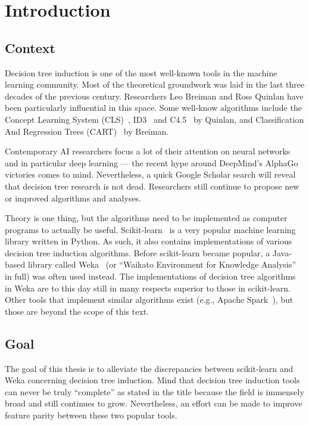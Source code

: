 \chapter{Introduction}\label{cha:intro}

\section{Context}
Decision tree induction is one of the most well-known tools in the machine learning community. Most of the theoretical groundwork was laid in the last three decades of the previous century. Researchers Leo Breiman and Ross Quinlan have been particularly influential in this space. Some well-know algorithms include the Concept Learning System (CLS)~\cite{cls}, ID3~\cite{id3, id3bis, id3ter} and C4.5~\cite{c45} by Quinlan, and Classification And Regression Trees (CART)~\cite{cart} by Breiman. 

Contemporary AI researchers focus a lot of their attention on neural networks and in particular deep learning --- the recent hype around DeepMind's AlphaGo~\cite{alphago} victories comes to mind. Nevertheless, a quick Google Scholar search will reveal that decision tree research is not dead. Researchers still continue to propose new or improved algorithms and analyses.

Theory is one thing, but the algorithms need to be implemented as computer programs to actually be useful. Scikit-learn~\cite{scikit-learn} is a very popular machine learning library written in Python. As such, it also contains implementations of various decision tree induction algorithms. Before scikit-learn became popular, a Java-based library called Weka~\cite{eibe2016weka} (or ``Waikato Environment for Knowledge Analysis'' in full) was often used instead. The implementations of decision tree algorithms in Weka are to this day still in many respects superior to those in scikit-learn. Other tools that implement similar algorithms exist (e.g., Apache Spark~\cite{spark}), but those are beyond the scope of this text.

\section{Goal}
The goal of this thesis is to alleviate the discrepancies between scikit-learn and Weka concerning decision tree induction. Mind that decision tree induction tools can never be truly ``complete'' as stated in the title because the field is immensely broad and still continues to grow. Nevertheless, an effort can be made to improve feature parity between these two popular tools.

